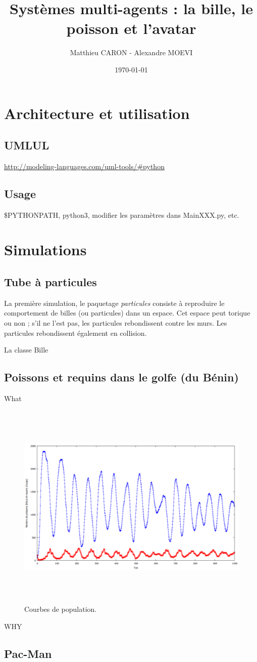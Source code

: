 \documentclass[a4paper]{article}
\title{Systèmes multi-agents : la bille, le poisson et l'avatar}
\author{Matthieu CARON - Alexandre MOEVI}
\date{\today}
\begin{document}
\maketitle

\section{Architecture et utilisation}

\subsection{UMLUL}
\url{http://modeling-languages.com/uml-tools/#python}

\subsection{Usage}

\$PYTHONPATH, python3, modifier les paramètres dans MainXXX.py, etc.
\section{Simulations}

\subsection{Tube à particules}

La première simulation, le paquetage \textit{particules} consiste à reproduire le comportement de billes (ou particules) dans un espace. Cet espace peut torique ou non ; s'il ne l'est pas, les particules rebondissent contre les murs. Les particules rebondissent également en collision.

\medskip
La classe Bille

\subsection{Poissons et requins dans le golfe (du Bénin)}
What
 
\begin{figure}[!h]
\centering
\includegraphics[height=10cm]{1000tours.png}
\caption{Courbes de population.}
\end{figure}

WHY
\subsection{Pac-Man}
\end{document}
